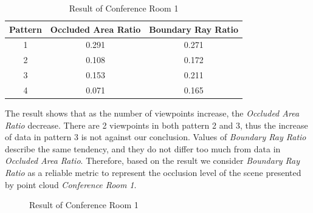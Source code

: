 \documentclass[11pt, a4paper,oneside,chapterprefix=false]{scrbook}
\begin{document}
\vspace{75pt}

\begin{table}[H]
    \centering
    \begin{tabular}{|c|c|c|}
        \hline
        \textbf{Pattern} & \textbf{Occluded Area Ratio} & \textbf{Boundary Ray Ratio} \\
        \hline
        1 & 0.291 & 0.271 \\
        2 & 0.108 & 0.172 \\
		3 & 0.153 & 0.211 \\
		4 & 0.071 & 0.165 \\
        \hline
    \end{tabular}
    \caption{Result of Conference Room 1}
    \label{tab:result of conference room 1}
\end{table}

The result shows that as the number of viewpoints increase, the \textit{Occluded Area Ratio} decrease. There are 2 viewpoints in both pattern 2 and 3, thus the increase of data in pattern 3 is not against our conclusion. Values of \textit{Boundary Ray Ratio} describe the same tendency, and they do not differ too much from data in \textit{Occluded Area Ratio}. Therefore, based on the result we consider \textit{Boundary Ray Ratio} as a reliable metric to represent the occlusion level of the scene presented by point cloud \textit{Conference Room 1}.       

\begin{figure}[H]
    \centering
    \caption{Result of Conference Room 1}
    \label{fig:result of conference room 1}
\end{figure}
\end{document}
